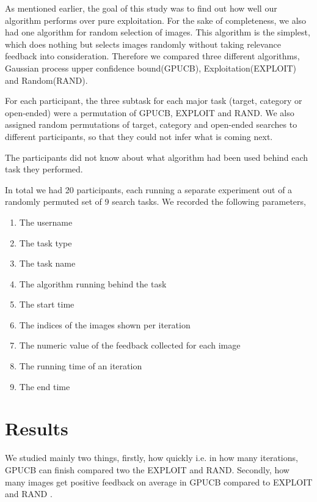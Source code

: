 \documentclass[english]{tktltiki}
\begin{document}
As mentioned earlier, the goal of this study was to find out how well our algorithm performs over pure exploitation. For the sake of completeness, we also had one algorithm for random selection of images. This algorithm is the simplest, which does nothing but selects images randomly without taking relevance feedback into consideration. Therefore we compared three different algorithms, Gaussian process upper confidence bound(GPUCB), Exploitation(EXPLOIT) and Random(RAND).

For each participant, the three subtask for each major task (target, category or open-ended) were a permutation of GPUCB, EXPLOIT and RAND. We also assigned random permutations of target, category and open-ended searches to different participants, so that they could not infer what is coming next.

The participants did not know about what algorithm had been used behind each task they performed.

In total we had 20 participants, each running a separate experiment out of a randomly permuted set of 9 search tasks. We recorded the following parameters,

\begin{enumerate}
	\item The username
	\item The task type
	\item The task name
	\item The algorithm running behind the task
	\item The start time
	\item The indices of the images shown per iteration
	\item The numeric value of the feedback collected for each image
	\item The running time of an iteration
	\item The end time
\end{enumerate}

\section{Results}

We studied mainly two things, firstly, how quickly i.e. in how many iterations, GPUCB can finish compared two the EXPLOIT and RAND. Secondly, how many images get positive feedback on average in GPUCB compared to EXPLOIT and RAND \cite{explor_exploit_img_ret}.
\end{document}
